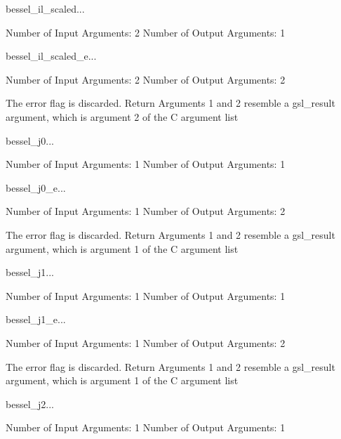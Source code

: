 \begin{funcdesc}{bessel_il_scaled}{...}

    Number of Input  Arguments:  2
    Number of Output Arguments:  1
\end{funcdesc}

\begin{funcdesc}{bessel_il_scaled_e}{...}

    Number of Input  Arguments:  2
    Number of Output Arguments:  2

The error flag is discarded.
Return Arguments 1 and 2 resemble a gsl_result argument,
	which is  argument 2 of the C argument list

\end{funcdesc}

\begin{funcdesc}{bessel_j0}{...}

    Number of Input  Arguments:  1
    Number of Output Arguments:  1
\end{funcdesc}

\begin{funcdesc}{bessel_j0_e}{...}

    Number of Input  Arguments:  1
    Number of Output Arguments:  2

The error flag is discarded.
Return Arguments 1 and 2 resemble a gsl_result argument,
	which is  argument 1 of the C argument list

\end{funcdesc}

\begin{funcdesc}{bessel_j1}{...}

    Number of Input  Arguments:  1
    Number of Output Arguments:  1
\end{funcdesc}

\begin{funcdesc}{bessel_j1_e}{...}

    Number of Input  Arguments:  1
    Number of Output Arguments:  2

The error flag is discarded.
Return Arguments 1 and 2 resemble a gsl_result argument,
	which is  argument 1 of the C argument list

\end{funcdesc}

\begin{funcdesc}{bessel_j2}{...}

    Number of Input  Arguments:  1
    Number of Output Arguments:  1
\end{funcdesc}

